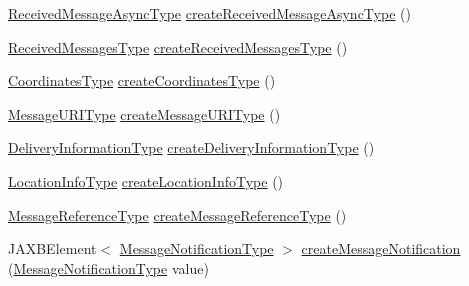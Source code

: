 \begin{DoxyCompactItemize}
\item 
\hyperlink{classcom_1_1telefonica_1_1schemas_1_1unica_1_1rest_1_1mms_1_1v1_1_1ReceivedMessageAsyncType}{ReceivedMessageAsyncType} \hyperlink{classcom_1_1telefonica_1_1schemas_1_1unica_1_1rest_1_1mms_1_1v1_1_1ObjectFactory_a0175ded871dc08f680d32518549d33f6}{createReceivedMessageAsyncType} ()
\item 
\hyperlink{classcom_1_1telefonica_1_1schemas_1_1unica_1_1rest_1_1mms_1_1v1_1_1ReceivedMessagesType}{ReceivedMessagesType} \hyperlink{classcom_1_1telefonica_1_1schemas_1_1unica_1_1rest_1_1mms_1_1v1_1_1ObjectFactory_aaf2a4acefb03fcac333b4a42df9fca4b}{createReceivedMessagesType} ()
\item 
\hyperlink{classcom_1_1telefonica_1_1schemas_1_1unica_1_1rest_1_1mms_1_1v1_1_1CoordinatesType}{CoordinatesType} \hyperlink{classcom_1_1telefonica_1_1schemas_1_1unica_1_1rest_1_1mms_1_1v1_1_1ObjectFactory_a2533b99b3e25ecd1290150c0bc7bdbcc}{createCoordinatesType} ()
\item 
\hyperlink{classcom_1_1telefonica_1_1schemas_1_1unica_1_1rest_1_1mms_1_1v1_1_1MessageURIType}{MessageURIType} \hyperlink{classcom_1_1telefonica_1_1schemas_1_1unica_1_1rest_1_1mms_1_1v1_1_1ObjectFactory_a28013a1ecd77e6600e63fb10437bf53b}{createMessageURIType} ()
\item 
\hyperlink{classcom_1_1telefonica_1_1schemas_1_1unica_1_1rest_1_1mms_1_1v1_1_1DeliveryInformationType}{DeliveryInformationType} \hyperlink{classcom_1_1telefonica_1_1schemas_1_1unica_1_1rest_1_1mms_1_1v1_1_1ObjectFactory_a1fe23994635d26258cb0e22256148be5}{createDeliveryInformationType} ()
\item 
\hyperlink{classcom_1_1telefonica_1_1schemas_1_1unica_1_1rest_1_1mms_1_1v1_1_1LocationInfoType}{LocationInfoType} \hyperlink{classcom_1_1telefonica_1_1schemas_1_1unica_1_1rest_1_1mms_1_1v1_1_1ObjectFactory_a19e7f17dad82d31f8e2f501d2e78cbb5}{createLocationInfoType} ()
\item 
\hyperlink{classcom_1_1telefonica_1_1schemas_1_1unica_1_1rest_1_1mms_1_1v1_1_1MessageReferenceType}{MessageReferenceType} \hyperlink{classcom_1_1telefonica_1_1schemas_1_1unica_1_1rest_1_1mms_1_1v1_1_1ObjectFactory_a3867bb1d73928057590ffc5ced99e637}{createMessageReferenceType} ()
\item 
JAXBElement$<$ \hyperlink{classcom_1_1telefonica_1_1schemas_1_1unica_1_1rest_1_1mms_1_1v1_1_1MessageNotificationType}{MessageNotificationType} $>$ \hyperlink{classcom_1_1telefonica_1_1schemas_1_1unica_1_1rest_1_1mms_1_1v1_1_1ObjectFactory_af9aad44b3e249c93aa43690cd90e2014}{createMessageNotification} (\hyperlink{classcom_1_1telefonica_1_1schemas_1_1unica_1_1rest_1_1mms_1_1v1_1_1MessageNotificationType}{MessageNotificationType} value)

\end{DoxyCompactItemize}
